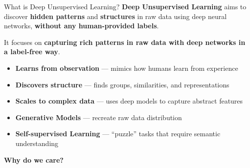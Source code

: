\begin{frame}{What is Deep Unsupervised Learning?}
    \textbf{Deep Unsupervised Learning} aims to discover \textbf{hidden patterns} and \textbf{structures} in raw data using deep neural networks, \textbf{without any human-provided labels}. 
    
    It focuses on \textbf{capturing rich patterns in raw data with deep networks in a label-free way}.
        \begin{itemize}
            \item \textbf{Learns from observation} --- mimics how humans learn from experience
            \item \textbf{Discovers structure} --- finds groups, similarities, and representations
            \item \textbf{Scales to complex data} --- uses deep models to capture abstract features
            \item \textbf{Generative Models} --- recreate raw data distribution
            \item \textbf{Self-supervised Learning} --- “puzzle” tasks that require semantic understanding
        \end{itemize}
        \vspace{0.5em}
        \centering
        {\Large \textbf{Why do we care?}}
\end{frame}

